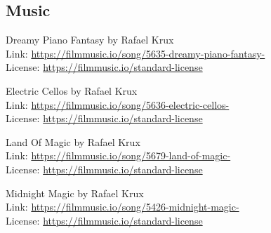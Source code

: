 \documentclass[10pt]{article}
\begin{document}
\subsection{Music}

Dreamy Piano Fantasy  by Rafael Krux\\
Link: \url{https://filmmusic.io/song/5635-dreamy-piano-fantasy-}\\
License: \url{https://filmmusic.io/standard-license}

Electric Cellos  by Rafael Krux\\
Link: \url{https://filmmusic.io/song/5636-electric-cellos-}\\
License: \url{https://filmmusic.io/standard-license}

Land Of Magic  by Rafael Krux\\
Link: \url{https://filmmusic.io/song/5679-land-of-magic-}\\
License: \url{https://filmmusic.io/standard-license}

Midnight Magic  by Rafael Krux\\
Link: \url{https://filmmusic.io/song/5426-midnight-magic-}\\
License: \url{https://filmmusic.io/standard-license}

\end{document}
